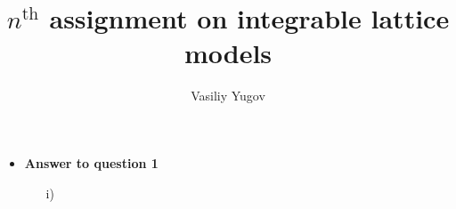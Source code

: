 \documentclass[report , a4paper, onecolumn, 12pt]{article}
\begin{document}
\author{Vasiliy Yugov}
\title{$n^{\text{th}}$ assignment on integrable lattice models}
\maketitle
\begin{itemize}

\item
\textbf{Answer to question 1}
\setcounter{equation}{0}

\begin{enumerate}
\item[i)]


 
\end{enumerate}


\end{itemize}
\end{document}
